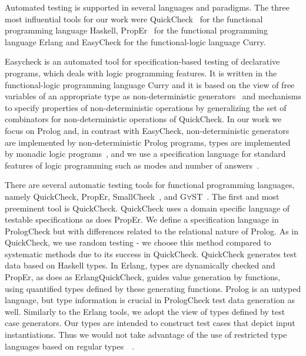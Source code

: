 \documentclass[runningheads,a4paper]{llncs}
\newcommand{\Prolog}[0]{{\sf Prolog}}
\newcommand{\Haskell}[0]{{\sf Haskell}}
\newcommand{\QuickCheck}[0]{{\sf QuickCheck}}
\newcommand{\plqc}[0]{{\sf PrologCheck}}
\begin{document}
Automated testing is supported in several languages and
paradigms.
%
The three most influential tools for our work were
\QuickCheck~\cite{quickcheck} for the functional programming language
\Haskell, {\sf PropEr}~\cite{papadakis2011proper} for the functional
programming language {\sf Erlang} and {\sf EasyCheck}
\cite{christiansen2008easycheck} for the functional-logic language {\sf Curry}.


{\sf Easycheck} is an automated tool for specification-based testing of
declarative programs, which deals with logic programming features.
%
It is written in the functional-logic programming language Curry and it
is based on the view of free variables of an appropriate type as
non-deterministic generators~\cite{antoy2006overlapping} and mechanisms
to specify properties of non-deterministic operations by generalizing the
set of combinators for non-deterministic operations of \QuickCheck{}.
%
In our work we focus on \Prolog{} and, in contrast with {\sf EasyCheck}, non-deterministic generators are implemented by non-deterministic \Prolog{}
programs, types are implemented by monadic logic programs~\cite{florido1992types,fruhwirth1991logic}, and
we use a specification language for standard features of
logic programming such as modes and number of
answers~\cite{Deville1990logprog}.


There are several automatic testing tools for functional programming
languages, namely \QuickCheck, {\sf PropEr}, {\sf SmallCheck}~\cite{runciman2008smallcheck},
and G$\forall$ST~\cite{koopman2003gast}.
The first and most preeminent tool is \QuickCheck{}.
%
\QuickCheck{} uses a domain specific language of testable specifications
as does {\sf PropEr}.
%
We define a specification language in \plqc{} but with
differences related to the relational nature of \Prolog{}.
%
As in \QuickCheck{}, we use random testing - we choose this method
compared to systematic methods due to its success in \QuickCheck{}.
%
\QuickCheck{} generates test data based on \Haskell{} types.
%
In {\sf Erlang}, types are dynamically checked and {\sf PropEr}, as does
as {\sf Erlang}\QuickCheck{}, guides value generation by functions,
using quantified types defined by these generating functions.
%
\Prolog{} is an untyped language, but type information is crucial in
\plqc{} test data generation as well.
%
Similarly to the {\sf Erlang} tools, we adopt the view of types defined
by test case generators.
%
Our types are intended to construct test cases that depict input
instantiations.
%
Thus we would not take advantage of the use of restricted type languages
based on regular types~\cite{florido1992types,fruhwirth1991logic}~\cite{Yardeni:1991:TSL:110703.110705,DBLP:conf/iclp/Zobel87}.
\end{document}
